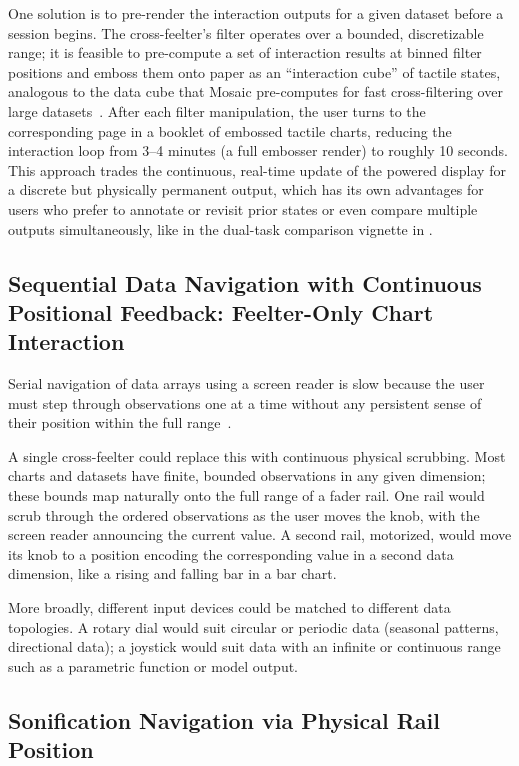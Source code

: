 \documentclass[12pt]{cmuthesis}
\begin{document}
One solution is to pre-render the interaction outputs for a given dataset before a session begins. The cross-feelter's filter operates over a bounded, discretizable range; it is feasible to pre-compute a set of interaction results at binned filter positions and emboss them onto paper as an ``interaction cube'' of tactile states, analogous to the data cube that Mosaic pre-computes for fast cross-filtering over large datasets~\cite{heer_mosaic_2023}. After each filter manipulation, the user turns to the corresponding page in a booklet of embossed tactile charts, reducing the interaction loop from 3--4 minutes (a full embosser render) to roughly 10 seconds. This approach trades the continuous, real-time update of the powered display for a discrete but physically permanent output, which has its own advantages for users who prefer to annotate or revisit prior states or even compare multiple outputs simultaneously, like in the dual-task comparison vignette in .

\subsection{Sequential Data Navigation with Continuous Positional Feedback: Feelter-Only Chart Interaction} %

Serial navigation of data arrays using a screen reader is slow because the user must step through observations one at a time without any persistent sense of their position within the full range~\cite{Elavsky2023}.

A single cross-feelter could replace this with continuous physical scrubbing. Most charts and datasets have finite, bounded observations in any given dimension; these bounds map naturally onto the full range of a fader rail. One rail would scrub through the ordered observations as the user moves the knob, with the screen reader announcing the current value. A second rail, motorized, would move its knob to a position encoding the corresponding value in a second data dimension, like a rising and falling bar in a bar chart.

More broadly, different input devices could be matched to different data topologies. A rotary dial would suit circular or periodic data (seasonal patterns, directional data); a joystick would suit data with an infinite or continuous range such as a parametric function or model output.

\subsection{Sonification Navigation via Physical Rail Position} %
\end{document}
